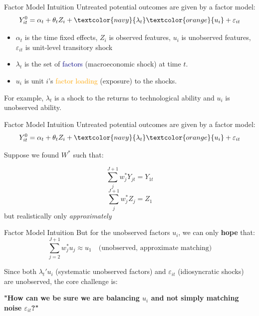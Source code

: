 \documentclass{beamer}
\begin{document}
\begin{frame}{Factor Model Intuition}
  Untreated potential outcomes are given by a factor model:
  \begin{equation}\label{eq:untreated_po}
    Y_{it}^0 = \alpha_t + \theta_t Z_i + \textcolor{navy}{\lambda_t} \textcolor{orange}{u_i} + \varepsilon_{it}
  \end{equation}

  \begin{itemize}
 \item $\alpha_t$ is the time fixed effects, $Z_i$ is observed features, $u_i$ is unobserved features, $\varepsilon_{it}$ is unit-level transitory shock
    \item $\lambda_t$ is the set of \textcolor{navy}{factors} (macroeconomic shock) at time $t$.
    \item $u_i$ is unit $i$'s \textcolor{orange}{factor loading} (exposure) to the shocks.
  \end{itemize}

  For example, $\lambda_t$ is a shock to the returns to technological ability and $u_i$ is unobserved ability.
\end{frame}


\begin{frame}{Factor Model Intuition}
  Untreated potential outcomes are given by a factor model:
  \begin{equation}\label{eq:untreated_po}
    Y_{it}^0 = \alpha_t + \theta_t Z_i + \textcolor{navy}{\lambda_t} \textcolor{orange}{u_i} + \varepsilon_{it}
  \end{equation}


Suppose we found $W^*$ such that:

$$\sum^{J+1}_jw^*_jY_{jt}=Y_{1t}$$ $$\sum^{J+1}_jw^*_jZ_{j}=Z_{1}$$ but realistically only \emph{approximately}

\end{frame}

\begin{frame}{Factor Model Intuition}
  But for the unobserved factors $u_i$, we can only \textbf{hope} that:
  \[
  \sum_{j=2}^{J+1} w_j^* u_j \approx u_1
  \quad \text{(unobserved, approximate matching)}
  \]

  \vspace{0.5cm}

  Since both $\lambda_t' u_i$ (systematic unobserved factors) and $\varepsilon_{it}$ (idiosyncratic shocks) are unobserved, the core challenge is:
  
  \begin{center}
  \textbf{"How can we be sure we are balancing $u_i$ and not simply matching noise $\varepsilon_{it}$?"}
  \end{center}
\end{frame}
\end{document}
